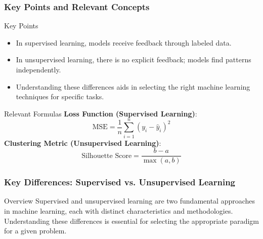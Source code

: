 \documentclass[aspectratio=169]{beamer}
\begin{document}
\begin{frame}[fragile]
    \frametitle{Key Points and Relevant Concepts}
    \begin{block}{Key Points}
        \begin{itemize}
            \item In supervised learning, models receive feedback through labeled data.
            \item In unsupervised learning, there is no explicit feedback; models find patterns independently.
            \item Understanding these differences aids in selecting the right machine learning techniques for specific tasks.
        \end{itemize}
    \end{block}
    
    \begin{block}{Relevant Formulas}
        \textbf{Loss Function (Supervised Learning)}:
        \begin{equation}
        \text{MSE} = \frac{1}{n}\sum_{i=1}^{n}(y_i - \hat{y}_i)^2
        \end{equation}
        \textbf{Clustering Metric (Unsupervised Learning)}:
        \begin{equation}
        \text{Silhouette Score} = \frac{b - a}{\max(a, b)}
        \end{equation}
    \end{block}
\end{frame}

\begin{frame}[fragile]
    \frametitle{Key Differences: Supervised vs. Unsupervised Learning}
    \begin{block}{Overview}
    Supervised and unsupervised learning are two fundamental approaches in machine learning, each with distinct characteristics and methodologies. Understanding these differences is essential for selecting the appropriate paradigm for a given problem.
    \end{block}
\end{frame}
\end{document}
